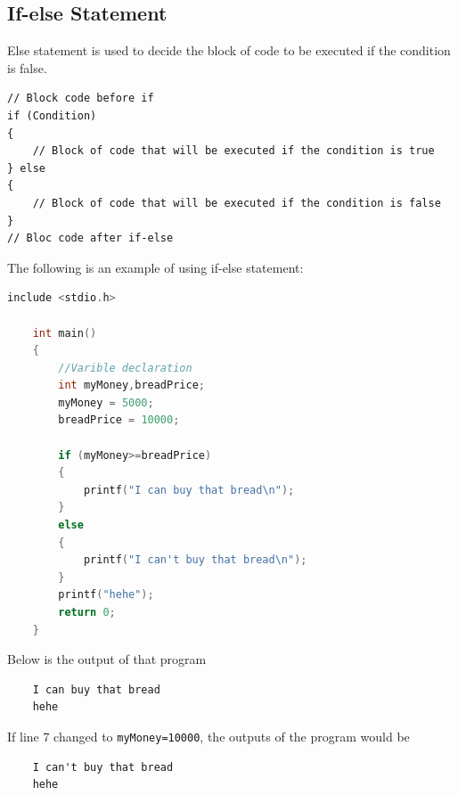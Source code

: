 \subsection{If-else Statement}
Else statement is used to decide the block of code to be executed if the condition is false.
\begin{verbatim}
// Block code before if
if (Condition) 
{
	// Block of code that will be executed if the condition is true
} else
{
	// Block of code that will be executed if the condition is false
}
// Bloc code after if-else
\end{verbatim}
The following is an example of using if-else statement:
\begin{lstlisting}[language=c,caption = If-else example,label=lst:ifelseexample01]
	include <stdio.h>
	
	int main()
	{
		//Varible declaration
		int myMoney,breadPrice;
		myMoney = 5000;
		breadPrice = 10000;
		
		if (myMoney>=breadPrice)
		{
		    printf("I can buy that bread\n");
		}
		else
		{
	        printf("I can't buy that bread\n");	
		}
		printf("hehe");
		return 0;
	}
\end{lstlisting}                        
Below is the output of that program
\begin{verbatim}
    I can buy that bread
    hehe
\end{verbatim}
If line 7 changed to \verb|myMoney=10000|, the outputs of the program would be
\begin{verbatim}
    I can't buy that bread
    hehe
\end{verbatim}

